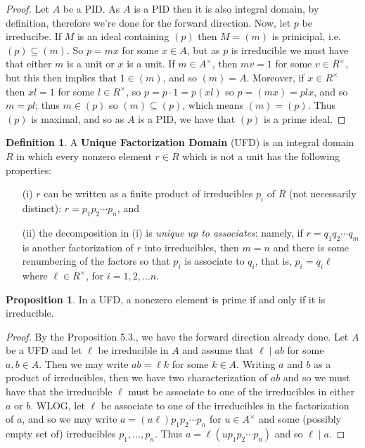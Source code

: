 \documentclass[9pt,reqno]{amsart}
\theoremstyle{definition}
\newtheorem{defi}{Definition}[section]
\newtheorem{prop}{Proposition}[section]
\begin{document}
\begin{proof}
	Let $A$ be a PID. As $A$ is a PID then it is also integral domain, by definition, therefore we're done for the forward direction. Now, let $p$ be irreducibe. If $M$ is an ideal containing $(p)$ then $M = (m)$ is prinicipal, i.e. $(p) \subseteq (m)$. So $p = mx$ for some $x \in A$, but as $p$ is irreducible we must have that either $m$ is a unit or $x$ is a unit. If $m \in A^\times$, then $mv = 1$ for some $v \in R^\times$, but this then implies that $1 \in (m)$, and so $(m) = A$. Moreover, if $x \in R^\times$ then $xl = 1$ for some $l \in R^\times$, so $p = p \cdot 1 = p (xl) $ so $p = (mx) = pl x $, and so $ m = pl  $; thus $m \in (p)$ so $(m) \subseteq (p)$, which means $(m) = (p)$. Thus $(p)$ is maximal, and so as $A$ is a PID, we have that $(p)$ is a prime ideal.
\end{proof}

\begin{defi}
A \textbf{Unique Factorization Domain} (UFD) is an integral domain $R$ in which every nonzero element $r \in R$ which is not a unit has the following properties: 
\begin{itemize}
	\item[(i)] $r$ can be written as a finite product of irreducibles $p_i$ of $R$ (not necessarily distinct): $r = p_1 p_2 \cdots p_n$, and 
	\item[(ii)] the decomposition in (i) is \textit{unique up to associates}: namely, if $r = q_1 q_2 \cdots q_m$ is another factorization of $r$ into irreducibles, then $m = n$ and there is some renumbering of the factors so that $p_i$ is associate to $q_i$, that is, $p_i = q_i \ell$ where $\ell \in R^\times$, for $i = 1,2, \ldots n$. 
\end{itemize}	
\end{defi}

\begin{prop}
	In a UFD, a nonezero element is prime if and only if it is irreducible. 
\end{prop}
\begin{proof}
	By the Proposition 5.3., we have the forward direction already done. Let $A$ be a UFD and let $\ell $ be irreducible in $A$ and assume that $\ell \mid ab$ for some $a, b \in A$. Then we may write $ab = \ell k$ for some $k \in A$. Writing $a$ and $b$ as a product of irreducibles, then we have two characterization of $ab$ and so we must have that the irreducible $\ell$ must be associate to one of the irreducibles in either $a$ or $b$. WLOG, let $\ell$ be associate to one of the irreducibles in the factorization of $a$, and so we may write $a = (u \ell) p_1 p_2 \cdots p_n$ for $u \in A^\times$ and some (possibly empty set of) irreducibles $p_1, \ldots, p_n$. Thus $a = \ell (u p_1 p_2 \cdots p_n)$ and so $\ell \mid a$.  
\end{proof}
\end{document}
